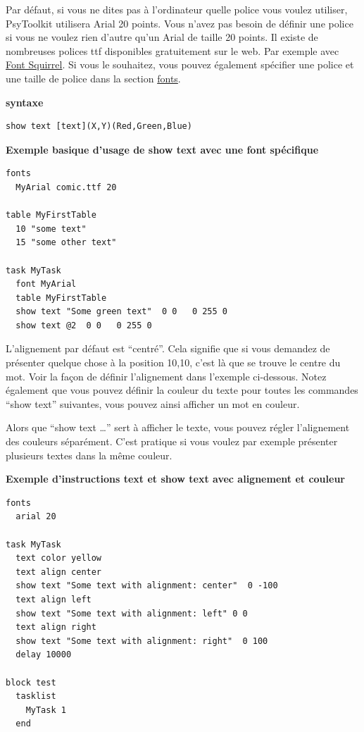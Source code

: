 \documentclass[
]{book}
\begin{document}
Par défaut, si vous ne dites pas à l'ordinateur quelle police vous voulez utiliser, PsyToolkit utilisera Arial 20 points. Vous n'avez pas besoin de définir une police si vous ne voulez rien d'autre qu'un Arial de taille 20 points. Il existe de nombreuses polices ttf disponibles gratuitement sur le web. Par exemple avec \href{https://www.fontsquirrel.com/}{Font Squirrel}. Si vous le souhaitez, vous pouvez également spécifier une police et une taille de police dans la section \protect\hyperlink{fonts}{fonts}.

\textbf{syntaxe}

\begin{verbatim}
show text [text](X,Y)(Red,Green,Blue)
\end{verbatim}

\textbf{Exemple basique d'usage de show text avec une font spécifique}

\begin{verbatim}
fonts
  MyArial comic.ttf 20

table MyFirstTable
  10 "some text"
  15 "some other text"

task MyTask
  font MyArial
  table MyFirstTable
  show text "Some green text"  0 0   0 255 0
  show text @2  0 0   0 255 0
\end{verbatim}

L'alignement par défaut est ``centré''. Cela signifie que si vous demandez de présenter quelque chose à la position 10,10, c'est là que se trouve le centre du mot. Voir la façon de définir l'alignement dans l'exemple ci-dessous. Notez également que vous pouvez définir la couleur du texte pour toutes les commandes ``show text'' suivantes, vous pouvez ainsi afficher un mot en couleur.

Alors que ``show text \ldots{}'' sert à afficher le texte, vous pouvez régler l'alignement des couleurs séparément. C'est pratique si vous voulez par exemple présenter plusieurs textes dans la même couleur.

\textbf{Exemple d'instructions text et show text avec alignement et couleur}

\begin{verbatim}
fonts
  arial 20

task MyTask
  text color yellow
  text align center
  show text "Some text with alignment: center"  0 -100
  text align left
  show text "Some text with alignment: left" 0 0
  text align right
  show text "Some text with alignment: right"  0 100
  delay 10000

block test
  tasklist
    MyTask 1
  end
\end{verbatim}
\end{document}
